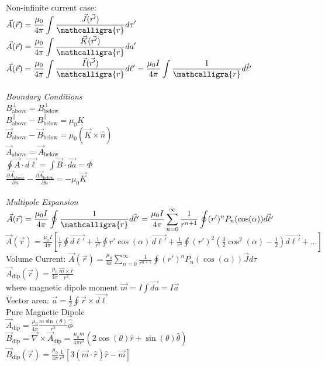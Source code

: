\documentclass[12pt]{article}
\newcommand{\ds}{\displaystyle}
\newcommand{\scripty}[1]{\ensuremath{\mathcalligra{#1}}}
\begin{document}
\begin{flushleft}
Non-infinite current case:\\
$\ds\vec{A}(\vec{r})=\frac{\mu_0}{4\pi}\int\frac{\vec{J}(\vec{r'})}{\scripty{r}}d\tau'$\\
$\ds\vec{A}(\vec{r})=\frac{\mu_0}{4\pi}\int\frac{\vec{K}(\vec{r'})}{\scripty{r}}da'$\\
$\ds\vec{A}(\vec{r})=\frac{\mu_0}{4\pi}\int\frac{\vec{I}(\vec{r'})}{\scripty{r}}d\ell'=\frac{\mu_0I}{4\pi}\int\frac{1}{\scripty{r}}\vec{d\ell'}$\\~\\

\textit{Boundary Conditions}\\
$\ds B_\text{above}^\perp=B_\text{below}^\perp$\\
$\ds B_\text{above}^\parallel-B_\text{below}^\parallel=\mu_0K$\\
$\ds \vec{B}_\text{above}-\vec{B}_\text{below}=\mu_0(\vec{K}\times\hat{n})$\\
$\ds \vec{A}_\text{above}=\vec{A}_\text{below}$\\
$\ds \oint\vec{A}\cdot\vec{d\ell}=\int\vec{B}\cdot\vec{da}=\Phi$\\
$\ds \frac{\partial\vec{A}_\text{above}}{\partial n}-\frac{\partial\vec{A}_\text{below}}{\partial n}=-\mu_0\vec{K}$\\~\\

\textit{Multipole Expansion}\\
$\ds\vec{A}(\vec{r})=\frac{\mu_0I}{4\pi}\oint\frac{1}{\scripty{r}}\vec{d\ell'}=\frac{\mu_0I}{4\pi}\sum_{n=0}^\infty\frac{1}{r^{n+1}}\oint(r')^nP_n(\cos(\alpha))\vec{d\ell'}$\\
$\ds\vec{A}(\vec{r})=\frac{\mu_0I}{4\pi}\left[\frac{1}{r}\oint\vec{d\ell'}+\frac{1}{r^2}\oint r'\cos(\alpha)\,\vec{d\ell'}+\frac{1}{r^3}\oint(r')^2\left(\frac{3}{2}\cos^2(\alpha)-\frac{1}{2}\right)\vec{d\ell'}+\dots\right]$\\
Volume Current: $\ds\vec{A}(\vec{r})=\frac{\mu_0}{4\pi}\sum_{n=0}^\infty\frac{1}{r^{n+1}}\oint(r')^nP_n(\cos(\alpha))\vec{J}d\tau$\\
$\ds \vec{A}_\text{dip}(\vec{r})=\frac{\mu_0}{4\pi}\frac{\vec{m}\times\hat{r}}{r^2}$\\
where magnetic dipole moment $\vec{m}=I\int\vec{da}=I\vec{a}$\\
Vector area: $\vec{a}=\frac{1}{2}\oint\vec{r}\times\vec{d\ell}$\\
Pure Magnetic Dipole\\
$\ds \vec{A}_\text{dip}=\frac{\mu_0}{4\pi}\frac{m\sin(\theta)}{r^2}\hat{\phi}$\\
$\ds \vec{B}_\text{dip}=\vec{\nabla}\times\vec{A}_\text{dip}=\frac{\mu_0m}{4\pi r^3}(2\cos(\theta)\hat{r}+\sin(\theta)\hat{\theta})$\\
$\ds\vec{B}_\text{dip}(\vec{r})=\frac{\mu_0}{4\pi}\frac{1}{r^3}\left[3(\vec{m}\cdot\hat{r})\hat{r}-\vec{m}\right]$\\~\\


\end{flushleft}
\end{document}
